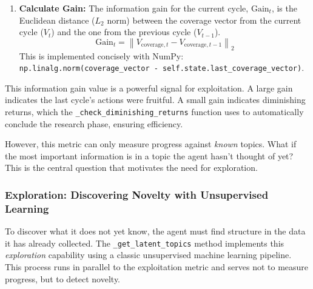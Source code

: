 \documentclass[12pt, a4paper]{article}
\begin{document}
\begin{enumerate}
    \item \textbf{Calculate Gain:} The information gain for the current cycle, $\mathrm{Gain}_t$, is the Euclidean distance ($L_2$ norm) between the coverage vector from the current cycle ($V_t$) and the one from the previous cycle ($V_{t-1}$).
    \begin{equation}
    \mathrm{Gain}_t = \left\| V_{\mathrm{coverage}, t} - V_{\mathrm{coverage}, t-1} \right\|_2
    \end{equation}
    This is implemented concisely with NumPy: \verb|np.linalg.norm(coverage_vector - self.state.last_coverage_vector)|.
\end{enumerate}

This information gain value is a powerful signal for exploitation. A large gain indicates the last cycle's actions were fruitful. A small gain indicates diminishing returns, which the \verb|_check_diminishing_returns| function uses to automatically conclude the research phase, ensuring efficiency.

However, this metric can only measure progress against \textit{known} topics. What if the most important information is in a topic the agent hasn't thought of yet? This is the central question that motivates the need for exploration.

\subsubsection{Exploration: Discovering Novelty with Unsupervised Learning}

To discover what it does not yet know, the agent must find structure in the data it has already collected. The \verb|_get_latent_topics| method implements this \textit{exploration} capability using a classic unsupervised machine learning pipeline. This process runs in parallel to the exploitation metric and serves not to measure progress, but to detect novelty.
\end{document}
